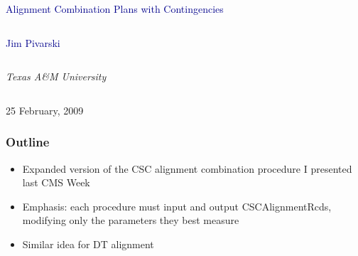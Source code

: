 \documentclass[compress]{beamer}
\begin{document}
\begin{frame}
\vfill
\begin{center}
\textcolor{darkblue}{\Large Alignment Combination Plans with Contingencies}

\vfill
\begin{columns}
\begin{center}
\large
\textcolor{darkblue}{Jim Pivarski}
\end{center}
\end{columns}

\begin{columns}
\begin{center}
\scriptsize
{\it Texas A\&M University}
\end{center}
\end{columns}

\vfill
25 February, 2009

\end{center}
\end{frame}


\small

\begin{frame}
\frametitle{Outline}
\begin{itemize}\setlength{\itemsep}{0.75 cm}
\item Expanded version of the CSC alignment combination procedure I
  presented last CMS Week
\item Emphasis: each procedure must input and output \mbox{CSCAlignmentRcds,\hspace{-1 cm}}
  modifying only the parameters they best measure
\item Similar idea for DT alignment
\end{itemize}
\end{frame}
\end{document}
